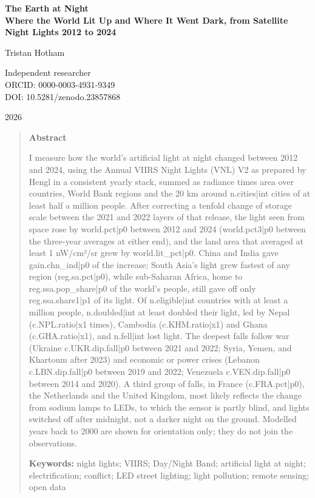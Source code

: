\documentclass[11pt,a4paper]{article}
\begin{document}
\begin{center}
{\Large\bfseries The Earth at Night\\[2pt] Where the World Lit Up and Where It Went Dark, from Satellite Night Lights 2012 to 2024\par}
\vspace{1.2em}
{\large Tristan Hotham\par}
\vspace{0.3em}
{\small Independent researcher\\
ORCID: 0000-0003-4931-9349\\
DOI: 10.5281/zenodo.23857868\par}
\vspace{0.8em}
2026
\end{center}

\begin{quote}
\small
\begin{center}\textbf{Abstract}\end{center}
I measure how the world's artificial light at night changed between 2012 and 2024, using the Annual VIIRS Night Lights (VNL) V2 as prepared by Hengl in a consistent yearly stack, summed as radiance times area over countries, World Bank regions and the 20 km around {{n.cities|int}} cities of at least half a million people. After correcting a tenfold change of storage scale between the 2021 and 2022 layers of that release, the light seen from space rose by {{world.pct|p0}} between 2012 and 2024 ({{world.pct3|p0}} between the three-year averages at either end), and the land area that averaged at least 1 nW/cm²/sr grew by {{world.lit_pct|p0}}. China and India gave {{gain.chn_ind|p0}} of the increase; South Asia's light grew fastest of any region ({{reg.sa.pct|p0}}), while sub-Saharan Africa, home to {{reg.ssa.pop_share|p0}} of the world's people, still gave off only {{reg.ssa.share1|p1}} of its light. Of {{n.eligible|int}} countries with at least a million people, {{n.doubled|int}} at least doubled their light, led by Nepal ({{c.NPL.ratio|x1}} times), Cambodia ({{c.KHM.ratio|x1}}) and Ghana ({{c.GHA.ratio|x1}}), and {{n.fell|int}} lost light. The deepest falls follow war (Ukraine {{c.UKR.dip.fall|p0}} between 2021 and 2022; Syria, Yemen, and Khartoum after 2023) and economic or power crises (Lebanon {{c.LBN.dip.fall|p0}} between 2019 and 2022; Venezuela {{c.VEN.dip.fall|p0}} between 2014 and 2020). A third group of falls, in France ({{c.FRA.pct|p0}}), the Netherlands and the United Kingdom, most likely reflects the change from sodium lamps to LEDs, to which the sensor is partly blind, and lights switched off after midnight, not a darker night on the ground. Modelled years back to 2000 are shown for orientation only; they do not join the observations.

\textbf{Keywords:} night lights; VIIRS; Day/Night Band; artificial light at night; electrification; conflict; LED street lighting; light pollution; remote sensing; open data
\end{quote}
\end{document}
